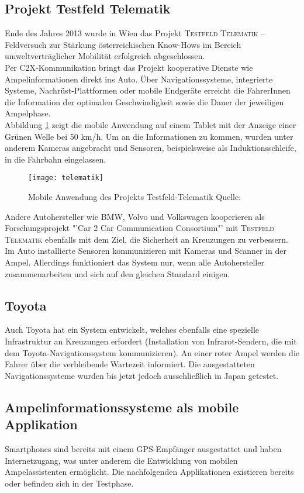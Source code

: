 \subsection*{Projekt Testfeld Telematik}
Ende des Jahres 2013 wurde in Wien das Projekt \textsc{Testfeld Telematik} -- Feldversuch zur Stärkung österreichischen Know-Hows im Bereich umweltverträglicher Mobilität erfolgreich abgeschlossen.\\
Per \gls{C2X}-Kommunikation bringt das Projekt kooperative Dienste wie Ampelinformationen direkt ins Auto. Über Navigationssysteme, integrierte Systeme, Nachrüst-Plattformen oder mobile Endgeräte erreicht die FahrerInnen die Information der optimalen Geschwindigkeit sowie die Dauer der jeweiligen Ampelphase. \cite{Telematik}\\ 
Abbildung \ref{fig:telematik} zeigt die mobile Anwendung auf einem Tablet mit der Anzeige einer Grünen Welle bei 50 km/h. Um an die Informationen zu kommen, wurden unter anderem Kameras angebracht und Sensoren, beispielsweise als Induktionsschleife, in die Fahrbahn eingelassen. \\
\begin{figure}[H]
    \centering
    \texttt{[image: telematik]} 
    \grayRule
    \caption[Projekt Testfeld-Telematik Ampelinformation]{Mobile Anwendung des Projekts Testfeld-Telematik Quelle: \cite{Telematik}}
    \label{fig:telematik}
\end{figure}  
Andere Autohersteller wie BMW, Volvo und Volkswagen kooperieren als Forschungsprojekt "'Car 2 Car Communication Consortium"' mit \textsc{Testfeld Telematik} ebenfalls mit dem Ziel, die Sicherheit an Kreuzungen zu verbessern. Im Auto installierte Sensoren kommunizieren mit Kameras und Scanner in der Ampel. Allerdings funktioniert das System nur, wenn alle Autohersteller zusammenarbeiten und sich auf den gleichen Standard einigen. \cite{Siemens}
\subsection*{Toyota}
Auch Toyota hat ein System entwickelt, welches ebenfalls eine spezielle Infrastruktur an Kreuzungen erfordert (Installation von Infrarot-Sendern, die mit dem Toyota-Navigationssystem kommunizieren). An einer roter Ampel werden die Fahrer über die verbleibende Wartezeit informiert. Die ausgestatteten Navigationssysteme wurden bis jetzt jedoch ausschließlich in Japan getestet. \cite{Toyota}
%
%
\subsection{Ampelinformationssysteme als mobile Applikation}
\glspl{Smartphone} sind bereits mit einem \gls{GPS}-Empfänger ausgestattet und haben Internetzugang, was unter anderem die Entwicklung von mobilen Ampelassistenten ermöglicht. Die nachfolgenden Applikationen existieren bereits oder befinden sich in der Testphase.
